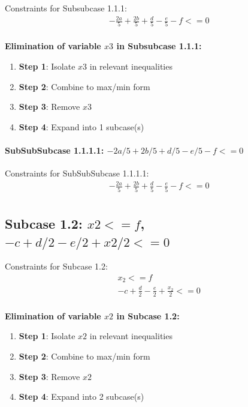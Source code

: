 \documentclass{article}
\begin{document}
Constraints for Subsubcase 1.1.1:
\begin{align}
& - \frac{2 a}{5} + \frac{2 b}{5} + \frac{d}{5} - \frac{e}{5} - f <= 0 \\
\end{align}

\textbf{Elimination of variable $x3$ in Subsubcase 1.1.1:}

\begin{enumerate}
\item \textbf{Step 1}: Isolate $x3$ in relevant inequalities
\item \textbf{Step 2}: Combine to max/min form
\item \textbf{Step 3}: Remove $x3$
\item \textbf{Step 4}: Expand into 1 subcase(s)
\end{enumerate}

\paragraph{SubSubSubcase 1.1.1.1: $-2 a/5 + 2 b/5 + d/5 - e/5 - f <= 0$}

Constraints for SubSubSubcase 1.1.1.1:
\begin{align}
& - \frac{2 a}{5} + \frac{2 b}{5} + \frac{d}{5} - \frac{e}{5} - f <= 0 \\
\end{align}

\subsection{Subcase 1.2: $x2 <= f$, $-c + d/2 - e/2 + x2/2 <= 0$}

Constraints for Subcase 1.2:
\begin{align}
& x_{2} <= f \\
& - c + \frac{d}{2} - \frac{e}{2} + \frac{x_{2}}{2} <= 0 \\
\end{align}

\textbf{Elimination of variable $x2$ in Subcase 1.2:}

\begin{enumerate}
\item \textbf{Step 1}: Isolate $x2$ in relevant inequalities
\item \textbf{Step 2}: Combine to max/min form
\item \textbf{Step 3}: Remove $x2$
\item \textbf{Step 4}: Expand into 2 subcase(s)
\end{enumerate}
\end{document}
